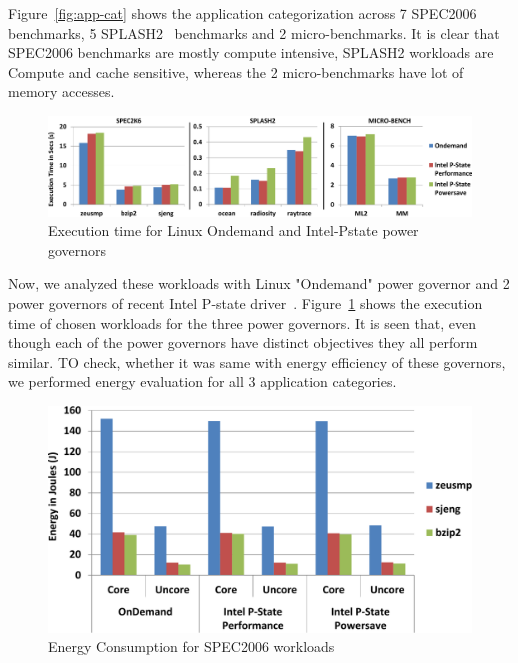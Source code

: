 Figure~\ref{fig:app-cat} shows the application categorization across 7 SPEC2006~\cite{spec2006} benchmarks, 5 SPLASH2~\cite{splash2} benchmarks and 2 micro-benchmarks. 
It is clear that SPEC2006 benchmarks are mostly compute intensive, 
SPLASH2 workloads are Compute and cache sensitive, whereas the 2 micro-benchmarks 
have lot of memory accesses.

\begin{figure}[ht]
  \begin{center}
\includegraphics[width=\linewidth]{figs/def-exec-time-crop.pdf}
  \end{center}
  \vspace{-0.1in}
  \caption{Execution time for Linux Ondemand and Intel-Pstate power governors}
  \label{fig:def-perf}
\end{figure}
\fi

Now, we analyzed these workloads with Linux "Ondemand" power governor and 2 power governors of recent Intel P-state driver~\cite{pstate}. Figure~\ref{fig:def-perf}
shows the execution time of chosen workloads for the three power governors. It is seen that, even though each of the power governors
have distinct objectives they all perform similar. TO check, whether it was same with
energy efficiency of these governors, we performed energy evaluation for all 3 application categories.


\begin{figure}[h]
  \begin{center}
\includegraphics[width=\linewidth]{figs/def-drivers-spec-crop.pdf}
  \end{center}
  \vspace{-0.1in}
  \caption{Energy Consumption for SPEC2006 workloads}
  \label{fig:spec-energy}
\end{figure}
\fi

